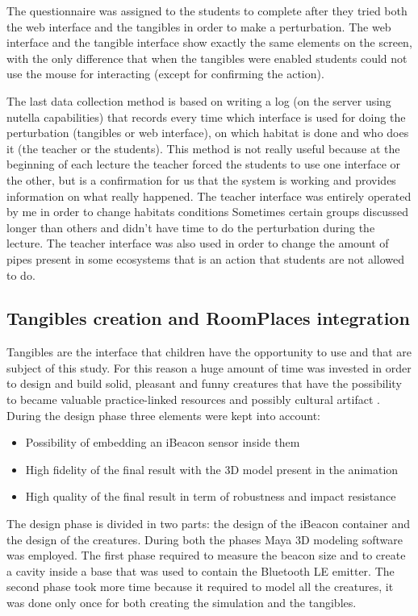 The questionnaire was assigned to the students to complete after they tried both the web interface and the tangibles in order to make a perturbation. The web interface and the tangible interface show exactly the same elements on the screen, with the only difference that when the tangibles were enabled students could not use the mouse for interacting (except for confirming the action).

The last data collection method is based on writing a log (on the server using nutella capabilities) that records every time which interface is used for doing the perturbation (tangibles or web interface), on which habitat is done and who does it (the teacher or the students). This method is not really useful because at the beginning of each lecture the teacher forced the students to use one interface or the other, but is a confirmation for us that the system is working and provides information on what really happened. The teacher interface was entirely operated by me in order to change habitats conditions Sometimes certain groups discussed longer than others and didn't have time to do the perturbation during the lecture. The teacher interface was also used in order to change the amount of pipes present in some ecosystems that is an action that students are not allowed to do.

\subsection{Tangibles creation and RoomPlaces integration}
Tangibles are the interface that children have the opportunity to use and that are subject of this study. For this reason a huge amount of time was invested in order to design and build solid, pleasant and funny creatures that have the possibility to became valuable practice-linked resources and possibly cultural artifact \cite{horn:role}. During the design phase three elements were kept into account:
\begin{itemize}
\item Possibility of embedding an iBeacon sensor inside them
\item High fidelity of the final result with the 3D model present in the animation
\item High quality of the final result in term of robustness and impact resistance 
\end{itemize}

The design phase is divided in two parts: the design of the iBeacon container and the design of the creatures. During both the phases Maya 3D modeling software was employed. The first phase required to measure the beacon size and to create a cavity inside a base that was used to contain the Bluetooth LE emitter. The second phase took more time because it required to model all the creatures, it was done only once for both creating the simulation and the tangibles.

